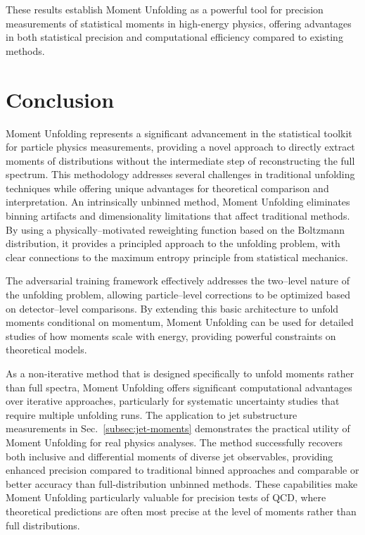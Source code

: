     These results establish Moment Unfolding as a powerful tool for precision measurements of statistical moments in high-energy physics, offering advantages in both statistical precision and computational efficiency compared to existing methods.

\section{Conclusion}
    Moment Unfolding represents a significant advancement in the statistical toolkit for particle physics measurements, providing a novel approach to directly extract moments of distributions without the intermediate step of reconstructing the full spectrum.
    This methodology addresses several challenges in traditional unfolding techniques while offering unique advantages for theoretical comparison and interpretation.
    An intrinsically unbinned method, Moment Unfolding eliminates binning artifacts and dimensionality limitations that affect traditional methods.
    By using a physically--motivated reweighting function based on the Boltzmann distribution, it provides a principled approach to the unfolding problem, with clear connections to the maximum entropy principle from statistical mechanics.

    The adversarial training framework effectively addresses the two--level nature of the unfolding problem, allowing particle--level corrections to be optimized based on detector--level comparisons.
    By extending this basic architecture to unfold moments conditional on momentum, Moment Unfolding can be used for detailed studies of how moments scale with energy, providing powerful constraints on theoretical models.
    
    As a non-iterative method that is designed specifically to unfold moments rather than full spectra, Moment Unfolding offers significant computational advantages over iterative approaches, particularly for systematic uncertainty studies that require multiple unfolding runs.
    The application to jet substructure measurements in Sec.~\ref{subsec:jet-moments} demonstrates the practical utility of Moment Unfolding for real physics analyses.
    The method successfully recovers both inclusive and differential moments of diverse jet observables, providing enhanced precision compared to traditional binned approaches and comparable or better accuracy than full-distribution unbinned methods.
    These capabilities make Moment Unfolding particularly valuable for precision tests of QCD, where theoretical predictions are often most precise at the level of moments rather than full distributions.
    
